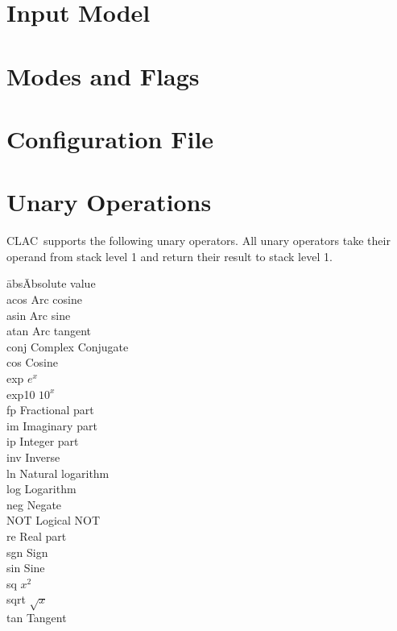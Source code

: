 \documentclass{report}
\newcommand{\CLAC}{CLAC}
\begin{document}
\chapter{Input Model}

\chapter{Modes and Flags}

\chapter{Configuration File}

\chapter{Unary Operations}

\CLAC\ supports the following unary operators. All unary operators take
their operand from stack level 1 and return their result to stack level
1.

\begin{tabbing}
\hspace*{3em}\=abs\hspace{3em}\=Absolute value\\
\>             acos\>           Arc cosine\\
\>             asin\>           Arc sine\\
\>             atan\>           Arc tangent\\
\>             conj\>           Complex Conjugate\\
\>             cos\>            Cosine\\
\>             exp\>            $e^{x}$\\
\>             exp10\>          $10^{x}$\\
\>             fp\>             Fractional part\\
\>             im\>             Imaginary part\\
\>             ip\>             Integer part\\
\>             inv\>            Inverse\\
\>             ln\>             Natural logarithm\\
\>             log\>            Logarithm\\
\>             neg\>            Negate\\
\>             NOT\>            Logical NOT\\
\>             re\>             Real part\\
\>             sgn\>            Sign\\
\>             sin\>            Sine\\
\>             sq\>             $x^{2}$\\
\>             sqrt\>           $\sqrt{x}$\\
\>             tan\>            Tangent\\
\end{tabbing}
\end{document}
